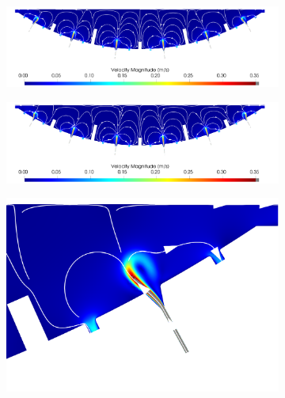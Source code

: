             \begin{figure}
                \centering
                \begin{subfigure}{\textwidth}
                    \centering
                    \includegraphics[width=\textwidth]{diagrams/results-variations/bifurcation-452.png}
                    \caption{}
                    \label{fig:bifurcations:452}
                \end{subfigure}
                \vfill
                \begin{subfigure}{\textwidth}
                    \centering
                    \includegraphics[width=\textwidth]{diagrams/results-variations/bifurcation-512.png}
                    \caption{}
                    \label{fig:bifurcations:512}
                \end{subfigure}
                \begin{subfigure}{0.45\textwidth}
                    \centering
                    \includegraphics[width=\textwidth]{diagrams/results-variations/bifurcation-452-zoom.png}

\end{subfigure}
\end{figure}
